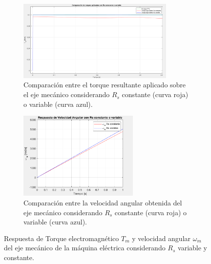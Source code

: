 \documentclass{article}
\begin{document}
\begin{figure}[H]
    \centering
    \begin{subfigure}[t]{\textwidth}
        \centering
        \includegraphics[width=0.85\textwidth]{Imagenes/ComparacionModuladorTorqueRs.png}
        \caption{Comparación entre el torque resultante aplicado sobre el eje mecánico considerando \(R_s\) constante (curva roja) o variable (curva azul).}
        \label{fig:ComparacionTorquesRs}
    \end{subfigure}
    
    \vspace{0.5cm} %
    
    \begin{subfigure}[t]{\textwidth}
        \centering
        \includegraphics[width=0.65\textwidth]{Imagenes/ComparacionVelocidadModuladorRs.png}
        \caption{Comparación entre la velocidad angular obtenida del eje mecánico considerando \(R_s\) constante (curva roja) o variable (curva azul).}
        \label{fig:ComparacionVelocidadRs}
    \end{subfigure}
    
    \caption{Respuesta de Torque electromagnético \(T_m\) y velocidad angular \(\omega_m\) del eje mecánico de la máquina eléctrica considerando $R_s$ variable y constante.}
    \label{fig:ComparacionModuladorTorqueRs}
\end{figure}
\end{document}
